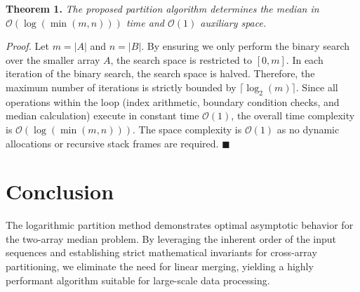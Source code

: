 \documentclass[10pt,journal,compsoc]{IEEEtran}
\begin{document}
\textbf{Theorem 1.} \textit{The proposed partition algorithm determines the median in $\mathcal{O}(\log(\min(m, n)))$ time and $\mathcal{O}(1)$ auxiliary space.}

\textit{Proof.} Let $m = |A|$ and $n = |B|$. By ensuring we only perform the binary search over the smaller array $A$, the search space is restricted to $[0, m]$. In each iteration of the binary search, the search space is halved. Therefore, the maximum number of iterations is strictly bounded by $\lceil \log_2(m) \rceil$. Since all operations within the loop (index arithmetic, boundary condition checks, and median calculation) execute in constant time $\mathcal{O}(1)$, the overall time complexity is $\mathcal{O}(\log(\min(m, n)))$. The space complexity is $\mathcal{O}(1)$ as no dynamic allocations or recursive stack frames are required. $\blacksquare$

\section{Conclusion}

The logarithmic partition method demonstrates optimal asymptotic behavior for the two-array median problem. By leveraging the inherent order of the input sequences and establishing strict mathematical invariants for cross-array partitioning, we eliminate the need for linear merging, yielding a highly performant algorithm suitable for large-scale data processing.
\end{document}
